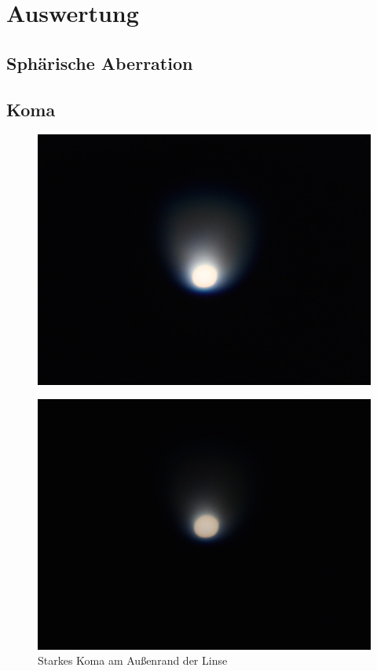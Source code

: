 \section{Auswertung}

\subsection{Sphärische Aberration}

\subsection{Koma}

\begin{figure}[htb]
	\begin{minipage}[t]{0.32\textwidth}
		\includegraphics[width=\linewidth]{img/Koma/Prakt_Linsenfehler_2015_06_04_097}
		\label{fig:koma_stark}
		\caption{Starkes Koma am Außenrand der Linse}
	\end{minipage}
	\hfill
	\begin{minipage}[t]{0.32\textwidth}
		\includegraphics[width=\linewidth]{img/Koma/Prakt_Linsenfehler_2015_06_04_096}

\end{minipage}
\end{figure}
